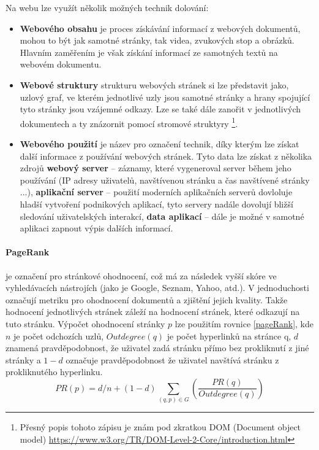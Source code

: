 \par Na webu lze využít několik možných technik dolování:
\begin{itemize}
  \item \textbf{Webového obsahu} je proces získávání informací z webových dokumentů, mohou to být jak samotné stránky, tak videa, zvukových stop a obrázků. Hlavním zaměřením je však získání informací ze samotných textů na webovém dokumentu.
  \item \textbf{Webové struktury} strukturu webových stránek si lze představit jako, uzlový graf, ve kterém jednotlivé uzly jsou samotné stránky a hrany spojující tyto stránky jsou vzájemné odkazy. Lze se také dále zanořit v jednotlivých dokumentech a ty znázornit pomocí stromové struktyry \footnote{Přesný popis tohoto zápisu je znám pod zkratkou DOM (Document object model) \url{https://www.w3.org/TR/DOM-Level-2-Core/introduction.html}}.
  \item \textbf{Webového použití} je název pro označení technik, díky kterým lze získat další informace z používání webových stránek. Tyto data lze získat z několika zdrojů \textbf{webový server} -- záznamy, které vygeneroval server během jeho používání (IP adresy uživatelů, navštívenou stránku a čas navštívené stránky ...), \textbf{aplikační server} -- použití moderních aplikačních serverů dovloluje hladší vytvoření podnikových aplikací, tyto servery nadále dovolují bližší sledování uživatelských interakcí, \textbf{data aplikací} -- dále je možné v samotné aplikaci zapnout výpis dalších informací. \cite{minigbook}
\end{itemize}

\paragraph{PageRank} je označení pro stránkové ohodnocení, což má za následek vyšší skóre ve vyhledávacích nástrojích (jako je Google, Seznam, Yahoo, atd.). V jednoduchosti označují metriku pro ohodnocení dokumentů a zjištění jejich kvality. Takže hodnocení jednotlivých stránek záleží na hodnocení stránek, které odkazují na tuto stránku. Výpočet ohodnocení stránky \(p\) lze použitím rovnice \ref{pageRank}, kde \(n\) je počet odchozích uzlů, \(Outdegree(q)\) je počet hyperlinků na stránce q, \(d\) znamená pravděpodobnost, že uživatel zadá stránku přímo bez prokliknutí z jiné stránky a \(1 - d\) označuje pravděpodobnost že uživatel navštívá stránku z prokliknutého hyperlinku. \cite{minigbook}
\begin{equation} \label{pageRank}
PR(p) = d/n + (1-d) \sum_{(q,p) \in G}(\frac{PR(q)}{Outdegree(q)})
\end{equation}

